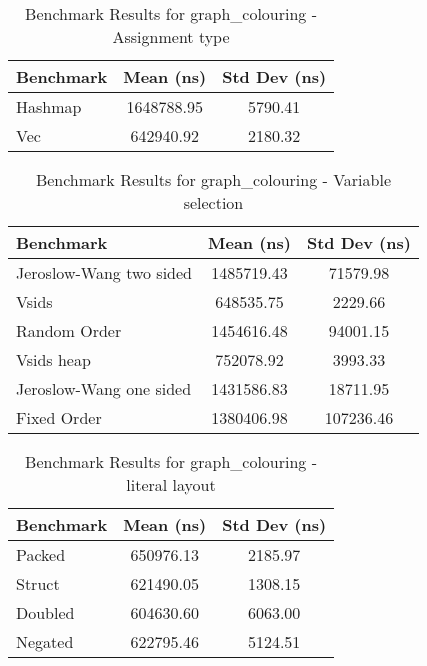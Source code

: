 \begin{table}[h]
    \centering
    \caption{Benchmark Results for graph\_colouring - Assignment type}
    \begin{tabular}{|l|c|c|}
        \hline
        Benchmark & Mean (ns) & Std Dev (ns) \\
        \hline
        Hashmap & 1648788.95 & 5790.41 \\
        Vec & 642940.92 & 2180.32 \\
        \hline
    \end{tabular}
\label{tab:bench-graph_colouring---Assignment-type}
\end{table}


\begin{table}[h]
    \centering
    \caption{Benchmark Results for graph\_colouring - Variable selection}
    \begin{tabular}{|l|c|c|}
        \hline
        Benchmark & Mean (ns) & Std Dev (ns) \\
        \hline
        Jeroslow-Wang two sided & 1485719.43 & 71579.98 \\
        Vsids & 648535.75 & 2229.66 \\
        Random Order & 1454616.48 & 94001.15 \\
        Vsids heap & 752078.92 & 3993.33 \\
        Jeroslow-Wang one sided & 1431586.83 & 18711.95 \\
        Fixed Order & 1380406.98 & 107236.46 \\
        \hline
    \end{tabular}
\label{tab:bench-graph_colouring---Variable-selection}
\end{table}


\begin{table}[h]
    \centering
    \caption{Benchmark Results for graph\_colouring - literal layout}
    \begin{tabular}{|l|c|c|}
        \hline
        Benchmark & Mean (ns) & Std Dev (ns) \\
        \hline
        Packed & 650976.13 & 2185.97 \\
        Struct & 621490.05 & 1308.15 \\
        Doubled & 604630.60 & 6063.00 \\
        Negated & 622795.46 & 5124.51 \\
        \hline
    \end{tabular}
\label{tab:bench-graph_colouring---literal-layout}
\end{table}


